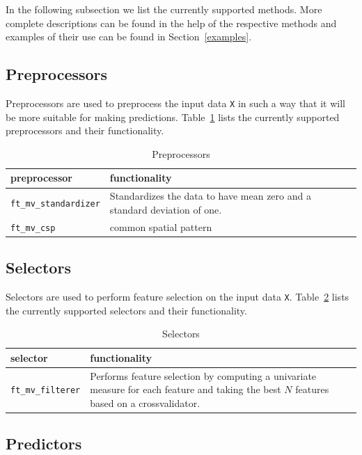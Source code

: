\documentclass{article}
\renewcommand{\t}[1]{{\tt #1}}
\begin{document}
In the following subsection we list the currently supported methods. More complete descriptions can be found in the help of the respective methods and examples of their use can be found in Section~\ref{examples}.

\subsection{Preprocessors}

Preprocessors are used to preprocess the input data \t{X} in such a way that it will be more suitable for making predictions. Table~\ref{preprocessors} lists the currently supported preprocessors and their functionality.

\begin{table}[ht]
\centering
\caption{Preprocessors}
\begin{tabular}{p{}|p{}}
\bf{preprocessor} & \bf{functionality}\\
\hline
\t{ft\_mv\_standardizer} & Standardizes the data to have mean zero and a standard deviation of one.\\
\t{ft\_mv\_csp} & common spatial pattern
\end{tabular}
\label{preprocessors}
\end{table}

\subsection{Selectors}

Selectors are used to perform feature selection on the input data \t{X}. Table~\ref{selectors} lists the currently supported selectors and their functionality.

\begin{table}[ht]
\centering
\caption{Selectors}
\begin{tabular}{p{}|p{}}
\bf{selector} & \bf{functionality}\\
\hline
\t{ft\_mv\_filterer} & Performs feature selection by computing a univariate measure for each feature and taking the best $N$ features based on a crossvalidator.
\end{tabular}
\label{selectors}
\end{table}

\subsection{Predictors}
\end{document}

